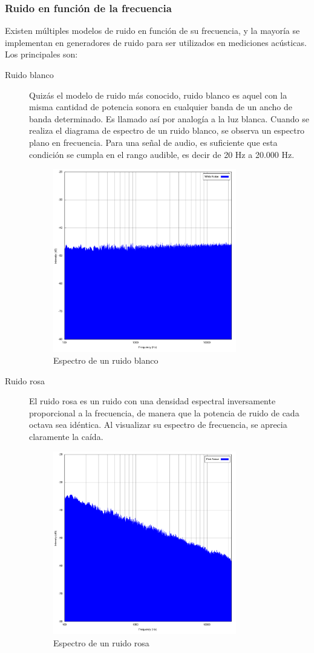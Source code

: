 \subsubsection{Ruido en función de la frecuencia}
Existen múltiples modelos de ruido en función de su frecuencia, y la mayoría se implementan en generadores de ruido para ser utilizados en mediciones acústicas. Los principales son:
\begin{description}
\item[Ruido blanco] Quizás el modelo de ruido más conocido, ruido blanco es aquel con la misma cantidad de potencia sonora en cualquier banda de un ancho de banda determinado. Es llamado así por analogía a la luz blanca. Cuando se realiza el diagrama de espectro de un ruido blanco, se observa un espectro plano en frecuencia. Para una señal de audio, es suficiente que esta condición se cumpla en el rango audible, es decir de 20 Hz a 20.000 Hz.
 \begin{figure}[H] \centering
    \includegraphics[height=8cm]{graphs/white_noise.png} \caption{Espectro de un ruido blanco}\label{fig:diagrama:ruidoblanco}
\end{figure}
\item[Ruido rosa] El ruido rosa es un ruido con una densidad espectral inversamente proporcional a la frecuencia, de manera que la potencia de ruido de cada octava sea idéntica. Al visualizar su espectro de frecuencia, se aprecia claramente la caída.
 \begin{figure}[H] \centering
    \includegraphics[height=8cm]{graphs/pink_noise.png} \caption{Espectro de un ruido rosa}\label{fig:diagrama:ruidorosa}
\end{figure}

\end{description}

